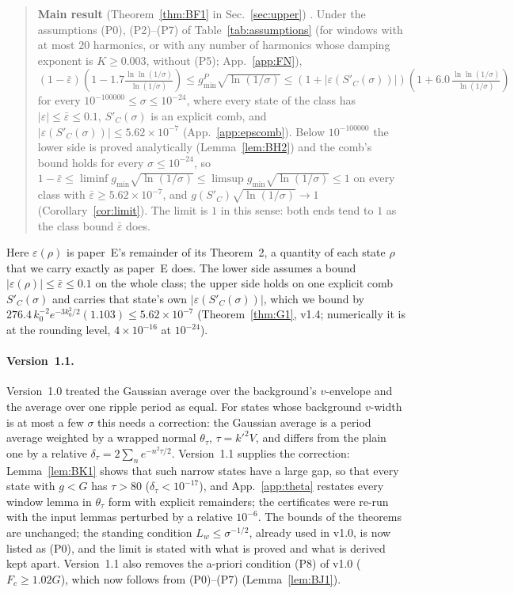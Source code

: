 \begin{quote}
\textbf{Main result} (Theorem~\ref{thm:BF1} in Sec.~\ref{sec:upper}) . Under the assumptions (P0), (P2)--(P7) of Table~\ref{tab:assumptions} (for windows with at most $20$ harmonics, or with any number of harmonics whose damping exponent is $K\ge0.003$, without (P5); App.~\ref{app:FN}),
$(1-\bar\varepsilon)(1-1.7\tfrac{\ln\ln(1/\sigma)}{\ln(1/\sigma)})\le g_{\min}^{P}\sqrt{\ln(1/\sigma)}
\le(1+|\varepsilon(S'_C(\sigma))|)(1+6.0\,\tfrac{\ln\ln(1/\sigma)}{\ln(1/\sigma)})$ for every $10^{-100000}\le\sigma\le10^{-24}$, where every state of the class has
$|\varepsilon|\le\bar\varepsilon\le0.1$, $S'_C(\sigma)$ is an explicit comb, and $|\varepsilon(S'_C(\sigma))|\le5.62\times10^{-7}$ (App.~\ref{app:epscomb}).
Below $10^{-100000}$ the lower side is proved analytically (Lemma~\ref{lem:BH2}) and the comb's bound holds for every $\sigma\le10^{-24}$, so
$1-\bar\varepsilon\le\liminf g_{\min}\sqrt{\ln(1/\sigma)}\le\limsup g_{\min}\sqrt{\ln(1/\sigma)}\le1$ on every class with $\bar\varepsilon\ge5.62\times10^{-7}$, and
$g(S'_C)\sqrt{\ln(1/\sigma)}\to1$ (Corollary~\ref{cor:limit}). The limit is $1$ in this sense: both ends tend to $1$ as the class bound $\bar\varepsilon$ does.
\end{quote}

Here $\varepsilon(\rho)$ is paper~E's remainder of its Theorem~2, a quantity of each state $\rho$ that we carry exactly as paper~E does. The lower
side assumes a bound $|\varepsilon(\rho)|\le\bar\varepsilon\le0.1$ on the whole class; the upper side holds on one explicit comb $S'_C(\sigma)$ and carries
that state's own $|\varepsilon(S'_C(\sigma))|$, which we bound by $276.4\,k_0^{-2}e^{-3k_0^2/2}(1.103)\le5.62\times10^{-7}$ (Theorem~\ref{thm:G1}, v1.4; numerically it is at the rounding level, $4\times10^{-16}$ at $10^{-24}$).

\paragraph*{Version~1.1.}
Version~1.0 treated the Gaussian average over the background's $v$-envelope and the average over one ripple period as equal. For states whose
background $v$-width is at most a few $\sigma$ this needs a correction: the Gaussian average is a period average weighted by a wrapped normal
$\theta_\tau$, $\tau=k'^2V$, and differs from the plain one by a relative $\delta_\tau=2\sum_ne^{-n^2\tau/2}$. Version~1.1 supplies the correction:
Lemma~\ref{lem:BK1} shows that such narrow states have a large gap, so that every state with $g<G$ has $\tau>80$ ($\delta_\tau<10^{-17}$), and
App.~\ref{app:theta} restates every window lemma in $\theta_\tau$ form with explicit remainders; the certificates were re-run with the input lemmas
perturbed by a relative $10^{-6}$. The bounds of the theorems are unchanged; the standing condition $L_w\le\sigma^{-1/2}$, already used in v1.0, is now listed as (P0), and the limit is stated with what is proved and what is derived kept apart. Version~1.1 also removes the a-priori condition (P8) of v1.0
($F_c\ge1.02G$), which now follows from (P0)--(P7) (Lemma~\ref{lem:BJ1}).

